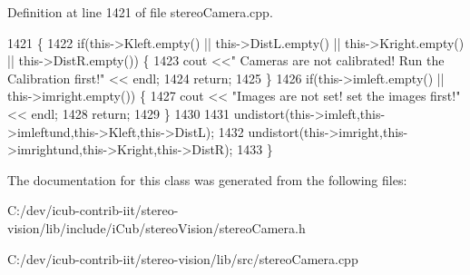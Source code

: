 Definition at line 1421 of file stereo\+Camera.\+cpp.


\begin{DoxyCode}
1421                                    \{
1422     \textcolor{keywordflow}{if}(this->Kleft.empty() || this->DistL.empty() || this->Kright.empty() || this->DistR.empty()) \{
1423         cout <<\textcolor{stringliteral}{" Cameras are not calibrated! Run the Calibration first!"} << endl;
1424         \textcolor{keywordflow}{return};
1425     \}
1426     \textcolor{keywordflow}{if}(this->imleft.empty() || this->imright.empty()) \{
1427           cout << \textcolor{stringliteral}{"Images are not set! set the images first!"} << endl;
1428           \textcolor{keywordflow}{return};
1429     \}
1430         
1431     undistort(this->imleft,this->imleftund,this->Kleft,this->DistL);
1432     undistort(this->imright,this->imrightund,this->Kright,this->DistR);
1433 \}
\end{DoxyCode}


The documentation for this class was generated from the following files\+:\begin{DoxyCompactItemize}
\item 
C\+:/dev/icub-\/contrib-\/iit/stereo-\/vision/lib/include/i\+Cub/stereo\+Vision/stereo\+Camera.\+h\item 
C\+:/dev/icub-\/contrib-\/iit/stereo-\/vision/lib/src/stereo\+Camera.\+cpp\end{DoxyCompactItemize}
